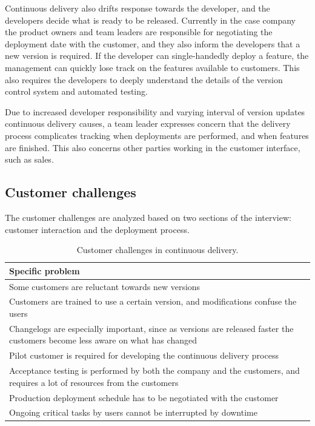 \documentclass[lnbip]{svmultln}
\begin{document}
Continuous delivery also drifts response towards the developer, and the developers decide what is ready to be released. Currently in the case company the product owners and team leaders are responsible for negotiating the deployment date with the customer, and they also inform the developers that a new version is required. If the developer can single-handedly deploy a feature, the management can quickly lose track on the features available to customers. This also requires the developers to deeply understand the details of the version control system and automated testing. 

Due to increased developer responsibility and varying interval of version updates continuous delivery causes, a team leader expresses concern that the delivery process complicates tracking when deployments are performed, and when features are finished. This also concerns other parties working in the customer interface, such as sales. 

\subsection{Customer challenges}
The customer challenges are analyzed based on two sections of the interview: customer interaction and the deployment process.

\begin{table}[htb]
    \begin{tabular}{ | p{12cm} |}
    \hline
    \textbf{Specific problem} \\ \hline
    Some customers are reluctant towards new versions \\ \hline
    Customers are trained to use a certain version, and modifications confuse the users \\ \hline
    Changelogs are especially important, since as versions are released faster the customers become less aware on what has changed  \\ \hline
    Pilot customer is required for developing the continuous delivery process \\ \hline
    Acceptance testing is performed by both the company and the customers, and requires a lot of resources from the customers \\ \hline
    Production deployment schedule has to be negotiated with the customer \\ \hline
    Ongoing critical tasks by users cannot be interrupted by downtime \\ 
    \hline
    \end{tabular}
    \caption{Customer challenges in continuous delivery.}
    \end{table}
\end{document}

